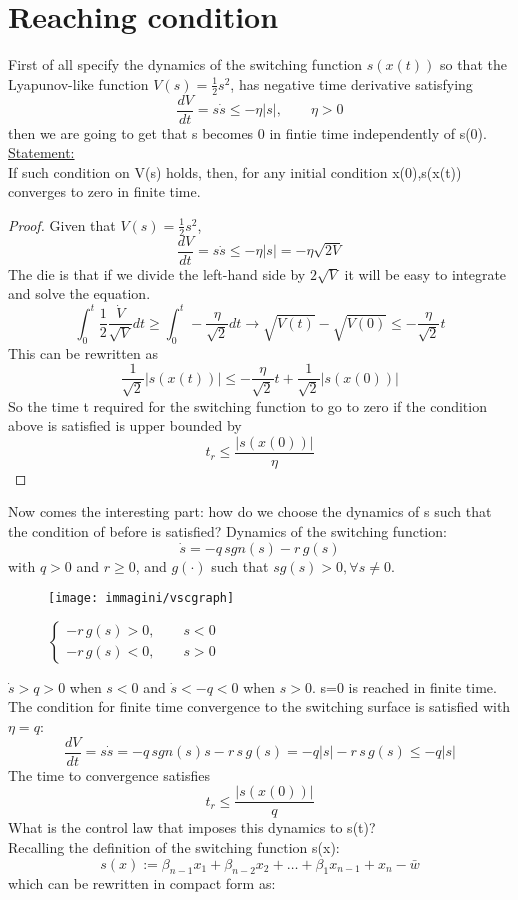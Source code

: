 \section{Reaching condition}
First of all specify the dynamics of the switching function $s(x(t))$ so that the Lyapunov-like function $V(s)=\frac{1}{2}s^2$, has negative time derivative satisfying \[\frac{dV}{dt}=s\dot{s}\le -\eta |s|,\qquad \eta>0\] then we are going to get that s becomes 0 in fintie time independently of s(0).\\
\underline{Statement:}\\ If such condition on V(s) holds, then, for any initial condition x(0),s(x(t)) converges to zero in finite time.
\begin{proof}
	Given that $V(s)=\frac{1}{2}s^2$, \[\frac{dV}{dt}=s\dot{s}\le -\eta |s|=-\eta\sqrt{2V}\]The die is that if we divide the left-hand side by $2\sqrt{V}$ it will be easy to integrate and solve the equation.\[
	\int_{0}^{t}\frac{1}{2}\frac{\dot{V}}{\sqrt{V}}dt\ge\int_{0}^{t}- \frac{\eta}{\sqrt{2}}dt\to\sqrt{V(t)}-\sqrt{V(0)}\le-\frac{\eta}{\sqrt{2}}t
\] This can be rewritten as \[
\frac{1}{\sqrt{2}}|s(x(t))|\le -\frac{\eta}{\sqrt{2}}t+\frac{1}{\sqrt{2}}|s(x(0))|
\]So the time t required for the switching function to go to zero if the condition above is satisfied is upper bounded by \[t_r\le\frac{|s(x(0))|}{\eta}\]
\end{proof}
Now comes the  interesting part: how do we choose the dynamics of s such that the condition of before is satisfied?
Dynamics of the switching function:
\[\dot{s}=-q \, sgn(s)-r \, g(s)\] with $q>0$ and $r\ge0$, and $g(\cdot)$ such that $sg(s)>0,\forall s\neq 0$.\begin{figure}[H]
	\centering
	\texttt{[image: immagini/vscgraph]}
	\caption{$\begin{cases}-r \, g(s)>0,\qquad s<0\\-r \, g(s)<0,\qquad s>0\end{cases}$}
	\label{fig:vscgraph}
\end{figure}
$\dot{s}>q>0$ when $s<0$ and $\dot{s}<-q<0$ when $s>0$. s=0 is reached in finite time.\\The condition for finite time convergence to the switching surface is satisfied with $\eta=q$:\[
\frac{dV}{dt}=s\dot{s}=-q \, sgn(s)s-r \, s	\, g(s)=-q|s|-r	\, s \, g(s)\le-q|s|
\]The time to convergence satisfies \[t_r\le\frac{|s(x(0))|}{q}\]What is the control law that imposes this dynamics to s(t)?\\
Recalling the definition of the switching function s(x):\[s(x):=\beta_{n-1}x_1+\beta_{n-2}x_2+\dots+\beta_1x_{n-1}+x_n-\bar{w}\] which can be rewritten in compact form as:
